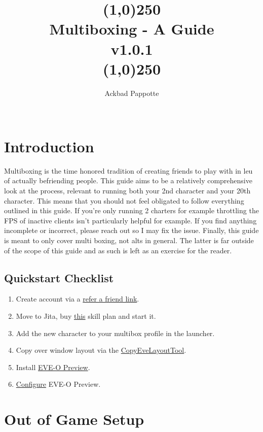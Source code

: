 \documentclass{article}
\title{
  \line(1,0){250} \\
  \textbf{Multiboxing - A Guide} \\
  v1.0.1 \\
  \line(1,0){250}
  }
\author{ 
  Ackbad Pappotte \\\
  }
\begin{document}



\maketitle

\section{Introduction}
Multiboxing is the time honored tradition of creating friends to play with in leu of actually befriending people. This guide aims to be a 
relatively comprehensive look at the process, relevant to running both your 2nd character and your 20th character. This means that you 
should not feel obligated to follow everything outlined in this guide. If you're only running 2 charters for example throttling the FPS of
inactive clients isn't particularly helpful for example. If you find anything incomplete or incorrect, please reach out so I may fix the
issue. Finally, this guide is meant to only cover multi boxing, not alts in general. The latter is far outside of the scope of this guide
and as such is left as an exercise for the reader.

\subsection{Quickstart Checklist}
\begin{enumerate}
  \item Create account via a \href{https://www.eveonline.com/signup?invc=79ffb3de-ef43-400b-a568-e45ac72c6715}{refer a friend link}.
  \item Move to Jita, buy \hyperref[generalSkillplan]{this} skill plan and start it.
  \item Add the new character to your multibox profile in the launcher.
  \item Copy over window layout via the \href{https://github.com/kshannoninnes/CopyEveLayoutTool}{CopyEveLayoutTool}.
  \item Install \href{https://github.com/Proopai/eve-o-preview/releases}{EVE-O Preview}.
  \item \href{https://github.com/Proopai/eve-o-preview}{Configure} EVE-O Preview.
\end{enumerate}

\clearpage
\section{Out of Game Setup}
\end{document}
